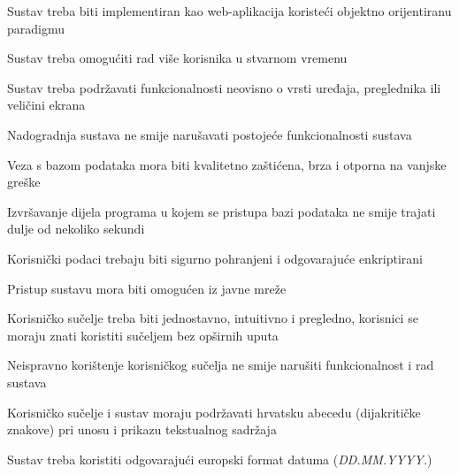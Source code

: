 		    
		    \begin{packed_item}
		        \item Sustav treba biti implementiran kao web-aplikacija koristeći objektno orijentiranu paradigmu
		        \item Sustav treba omogućiti rad više korisnika u stvarnom vremenu
		        \item Sustav treba podržavati funkcionalnosti neovisno o vrsti uređaja, preglednika ili veličini ekrana
		        \item Nadogradnja sustava ne smije narušavati postojeće funkcionalnosti sustava
		        \item Veza s bazom podataka mora biti kvalitetno zaštićena, brza i otporna na vanjske greške
		        \item Izvršavanje dijela programa u kojem se pristupa bazi podataka ne smije trajati dulje od nekoliko sekundi
		        \item Korisnički podaci trebaju biti sigurno pohranjeni i odgovarajuće enkriptirani
		        \item Pristup sustavu mora biti omogućen iz javne mreže
		        \item Korisničko sučelje treba biti jednostavno, intuitivno i pregledno, korisnici se moraju znati koristiti sučeljem bez opširnih uputa
		        \item Neispravno korištenje korisničkog sučelja ne smije narušiti funkcionalnost i rad sustava
		        \item Korisničko sučelje i sustav moraju podržavati hrvatsku abecedu (dijakritičke znakove) pri unosu i prikazu tekstualnog sadržaja
		        \item Sustav treba koristiti odgovarajući europski format datuma (\textit{DD.MM.YYYY.})
		        
		    \end{packed_item}
		    
	